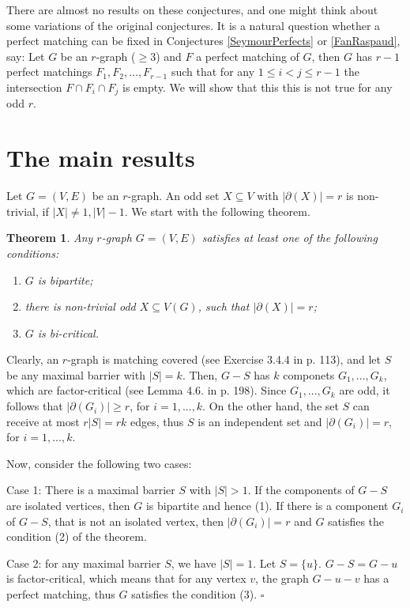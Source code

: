 \documentclass[fleqn,12pt]{article}
\newtheorem{theorem}{Theorem}
\newenvironment{proof}[1][Proof.]{\begin{trivlist}
\item[\hskip \labelsep {\bfseries #1}]}{\end{trivlist}}
\begin{document}
There are almost no results on these conjectures, and one might think about some variations of the original conjectures. 
It is a natural question whether a perfect matching can be fixed in Conjectures \ref{SeymourPerfects} or \ref{FanRaspaud}, say: 
Let $G$ be an $r$-graph ($ \geq 3$) and $F$ a perfect matching of $G$, then $G$ has $r-1$ perfect matchings $F_1,F_2, \dots ,F_{r-1}$ such that 
for any $1 \leq i < j \leq r-1$ the intersection $F \cap F_i \cap F_j$ is empty. We will show that this this is not true for any odd $r$. 


\section{The main results}

Let $G=(V,E)$ be an $r$-graph. An odd set $X \subseteq V$ with $|\partial(X)|=r$ is non-trivial, if $|X| \not = 1, |V|-1$.
We start with the following theorem. 

\begin{theorem}\label{decomposition}Any $r$-graph $G=(V,E)$ satisfies at least one of the following conditions:
\begin{enumerate}
	\item [(1)] $G$ is bipartite;
	\item [(2)] there is non-trivial odd $X\subseteq V(G)$, such that $|\partial(X)|=r$;
	\item [(3)] $G$ is bi-critical.
\end{enumerate}
\end{theorem}

\begin{proof} Clearly, an $r$-graph is matching covered (see Exercise 3.4.4 in \cite{Lov} p. 113), and let
$S$ be any maximal barrier with $|S|=k$. Then, $G-S$ has $k$ componets $G_1,...,G_k$, which are factor-critical (see Lemma 4.6. in \cite{Handbook} p. 198). 
Since $G_1,...,G_k$ are odd, it follows that $|\partial(G_i)|\geq r$, for $i=1,...,k$. On the other hand, the set $S$ can receive at most $r|S|=rk$ edges, 
thus $S$ is an independent set and $|\partial(G_i)|=r$, for $i=1,...,k$. 

Now, consider the following two cases:

Case 1: There is a maximal barrier $S$ with $|S|>1$. 
If the components of $G-S$ are isolated vertices, then $G$ is bipartite and hence (1). If there is a component $G_i$ of $G-S$, 
that is not an isolated vertex, then $|\partial(G_i)|=r$ and $G$ satisfies the condition (2) of the theorem.

Case 2: for any maximal barrier $S$, we have $|S|=1$.
Let $S=\{u\}$. $G-S=G-u$ is factor-critical, which means that for any vertex $v$, the graph $G-u-v$ has a perfect matching, thus $G$ satisfies the condition (3).
$\square$
\end{proof}
\end{document}
